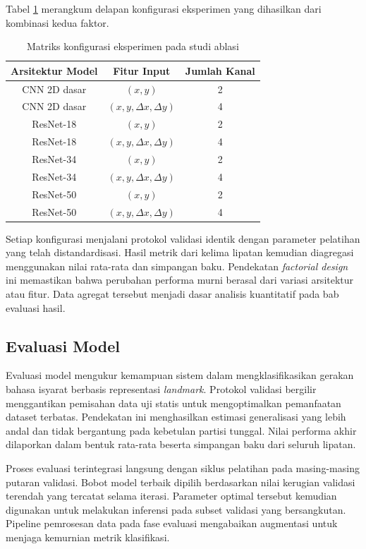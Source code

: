 Tabel \ref{tab:3-experiment-config} merangkum delapan konfigurasi eksperimen yang dihasilkan dari kombinasi kedua faktor.
\begin{table}[H]
\centering
\caption{Matriks konfigurasi eksperimen pada studi ablasi}
\label{tab:3-experiment-config}
\begin{tabular}{|c|c|c|}
\hline
\textbf{Arsitektur Model} & \textbf{Fitur Input} & \textbf{Jumlah Kanal} \\ \hline
CNN 2D dasar & $(x,y)$ & 2 \\ \hline
CNN 2D dasar & $(x,y,\Delta x, \Delta y)$ & 4 \\ \hline
ResNet-18 & $(x,y)$ & 2 \\ \hline
ResNet-18 & $(x,y,\Delta x, \Delta y)$ & 4 \\ \hline
ResNet-34 & $(x,y)$ & 2 \\ \hline
ResNet-34 & $(x,y,\Delta x, \Delta y)$ & 4 \\ \hline
ResNet-50 & $(x,y)$ & 2 \\ \hline
ResNet-50 & $(x,y,\Delta x, \Delta y)$ & 4 \\ \hline
\end{tabular}
\end{table}
Setiap konfigurasi menjalani protokol validasi identik dengan parameter pelatihan yang telah distandardisasi. 
Hasil metrik dari kelima lipatan kemudian diagregasi menggunakan nilai rata-rata dan simpangan baku. 
Pendekatan \textit{factorial design} ini memastikan bahwa perubahan performa murni berasal dari variasi arsitektur atau fitur. 
Data agregat tersebut menjadi dasar analisis kuantitatif pada bab evaluasi hasil.

\subsection{Evaluasi Model}
\label{subsec:evaluasi-model}
Evaluasi model mengukur kemampuan sistem dalam mengklasifikasikan gerakan bahasa isyarat berbasis representasi \textit{landmark}. 
Protokol validasi bergilir menggantikan pemisahan data uji statis untuk mengoptimalkan pemanfaatan dataset terbatas. 
Pendekatan ini menghasilkan estimasi generalisasi yang lebih andal dan tidak bergantung pada kebetulan partisi tunggal. 
Nilai performa akhir dilaporkan dalam bentuk rata-rata beserta simpangan baku dari seluruh lipatan.

Proses evaluasi terintegrasi langsung dengan siklus pelatihan pada masing-masing putaran validasi. 
Bobot model terbaik dipilih berdasarkan nilai kerugian validasi terendah yang tercatat selama iterasi. 
Parameter optimal tersebut kemudian digunakan untuk melakukan inferensi pada subset validasi yang bersangkutan. 
Pipeline pemrosesan data pada fase evaluasi mengabaikan augmentasi untuk menjaga kemurnian metrik klasifikasi.

